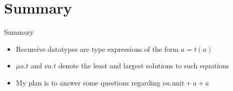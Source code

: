 \documentclass{beamer}
\begin{document}
\section*{Summary}

\begin{frame}{Summary}

  \begin{itemize}
  \item
    Recursive datatypes are type expressions of the form $a = t(a)$
  \item
    $\mu a . t$ and $\nu a . t$ denote the least and largest solutions to such
    equations
  \item
    My plan is to answer some questions regarding $\nu a . \text{unit} + a + a$
  \end{itemize}

\end{frame}
\end{document}
